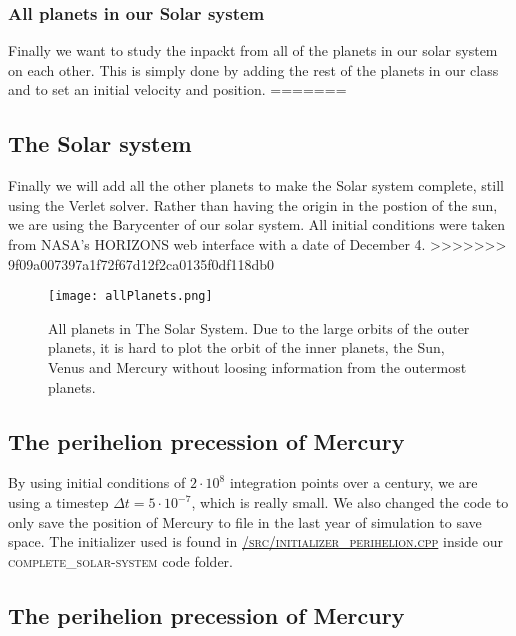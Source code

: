\documentclass[../main.tex]{subfiles}
\begin{document}
\subsubsection{All planets in our Solar system}
Finally we want to study the inpackt from all of the planets in our solar system on each other. This is simply done by adding the rest of the planets in our class and to set an initial velocity and position.  
=======
\subsection{The Solar system} \label{sec:results-entire-solar-system}
Finally we will add all the other planets to make the Solar system complete, still using the Verlet solver. Rather than having the origin in the postion of the sun, we are using the Barycenter of our solar system. All initial conditions were taken from NASA's HORIZONS web interface\cite{HorizonsNASA} with a date of December 4.
>>>>>>> 9f09a007397a1f72f67d12f2ca0135f0df118db0

\begin{figure}[!h]
\centering
  \texttt{[image: allPlanets.png]}
  \caption{All planets in The Solar System. Due to the large orbits of the outer planets, it is hard to plot the orbit of the inner planets, the Sun, Venus and Mercury without loosing information from the outermost planets.}
  \label{fig:allPlanets}
\end{figure}


\subsection{The perihelion precession of Mercury}
By using initial conditions of $2 \cdot 10^8$ integration points over a century, we are using a timestep $\Delta t = 5\cdot 10^{-7}$, which is really small. We also changed the code to only save the position of Mercury to file in the last year of simulation to save space. The initializer used is found in \href{https://github.com/kmaasrud/Project-5/blob/master/code/complete_solar-system/src/initialize_perihelion.cpp}{\textsc{/src/initializer\_perihelion.cpp}} inside our \textsc{complete\_solar-system} code folder.

\begin{table}[!h]
  \centering
  \caption{Table of Mercury's calculated perihelion precession with and without relativistic correction.}
\end{table}
\FloatBarrier

\subsection{The perihelion precession of Mercury}
\end{document}
